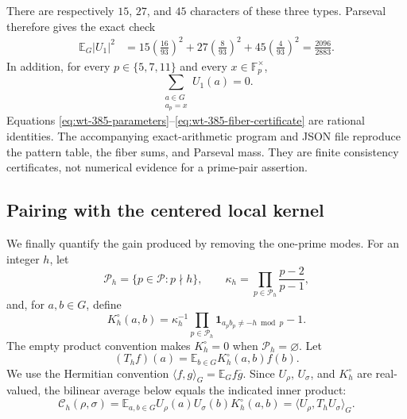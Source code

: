 There are respectively $15$, $27$, and $45$ characters of these three
types.  Parseval therefore gives the exact check
\begin{align}
 \mathbb E_G|U_1|^2
 &=15\left(\frac{16}{93}\right)^2
   +27\left(\frac8{93}\right)^2
   +45\left(\frac4{93}\right)^2
 =\frac{2096}{2883}.
 \label{eq:wt-385-parseval}
\end{align}
In addition, for every $p\in\{5,7,11\}$ and every
$x\in\mathbb F_p^\times$,
\begin{equation}
 \sum_{\substack{a\in G\\a_p=x}}U_1(a)=0.
 \label{eq:wt-385-fiber-certificate}
\end{equation}
Equations \eqref{eq:wt-385-parameters}--\eqref{eq:wt-385-fiber-certificate}
are rational identities.  The accompanying exact-arithmetic program and
JSON file reproduce the pattern table, the fiber sums, and Parseval mass.
They are finite consistency certificates, not numerical evidence for a
prime-pair assertion.

\subsection{Pairing with the centered local kernel}
\label{subsec:wt-kernel-pairing}

We finally quantify the gain produced by removing the one-prime modes.  For
an integer $h$, let
\begin{equation}
 \mathcal P_h=\{p\in\mathcal P:p\nmid h\},
 \qquad
 \kappa_h=\prod_{p\in\mathcal P_h}\frac{p-2}{p-1},
 \label{eq:wt-active-primes-kappa}
\end{equation}
and, for $a,b\in G$, define
\begin{equation}
 K_h^\circ(a,b)
 =\kappa_h^{-1}
  \prod_{p\in\mathcal P_h}\mathbf1_{a_pb_p\ne-h\bmod p}-1.
 \label{eq:wt-centered-local-kernel}
\end{equation}
The empty product convention makes $K_h^\circ=0$ when
$\mathcal P_h=\varnothing$.  Let
\begin{equation}
 (T_hf)(a)=\mathbb E_{b\in G}K_h^\circ(a,b)f(b).
 \label{eq:wt-centered-local-operator}
\end{equation}
We use the Hermitian convention
$\langle f,g\rangle_G=\mathbb E_G f\overline g$.  Since $U_\rho$, $U_\sigma$, and
$K_h^\circ$ are real-valued, the bilinear average below equals the indicated
inner product:
\begin{equation}
 \mathcal C_h(\rho,\sigma)
 =\mathbb E_{a,b\in G}
   U_\rho(a)U_\sigma(b)K_h^\circ(a,b)
 =\langle U_\rho,T_hU_\sigma\rangle_G.
 \label{eq:wt-pairing-definition}
\end{equation}

